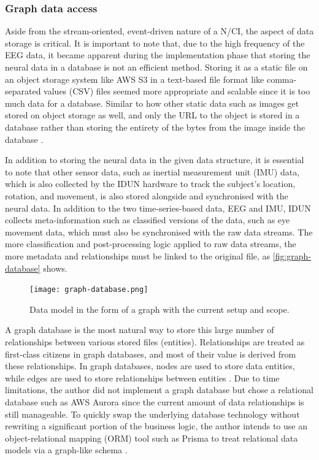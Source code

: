 \subsubsection{Graph data access}
\label{chapter5-graph-data-access}

Aside from the stream-oriented, event-driven nature of a N/CI, the aspect of data storage is critical. It is important to note that, due to the high frequency of the EEG data, it became apparent during the implementation phase that storing the neural data in a database is not an efficient method. Storing it as a static file on an object storage system like AWS S3 in a text-based file format like comma-separated values (CSV) files seemed more appropriate and scalable since it is too much data for a database. Similar to how other static data such as images get stored on object storage as well, and only the URL to the object is stored in a database rather than storing the entirety of the bytes from the image inside the database \citep{datanamic_store_nodate}.

In addition to storing the neural data in the given data structure, it is essential to note that other sensor data, such as inertial measurement unit (IMU) data, which is also collected by the IDUN hardware to track the subject's location, rotation, and movement, is also stored alongside and synchronised with the neural data. In addition to the two time-series-based data, EEG and IMU, IDUN collects meta-information such as classified versions of the data, such as eye movement data, which must also be synchronised with the raw data streams. The more classification and post-processing logic applied to raw data streams, the more metadata and relationships must be linked to the original file, as \autoref{fig:graph-database} shows.

\begin{figure}[!ht]
  \centering
  \texttt{[image: graph-database.png]}
  \caption{Data model in the form of a graph with the current setup and scope.}
  \label{fig:graph-database}
\end{figure}

A graph database is the most natural way to store this large number of relationships between various stored files (entities). Relationships are treated as first-class citizens in graph databases, and most of their value is derived from these relationships. In graph databases, nodes are used to store data entities, while edges are used to store relationships between entities \citep{amazon_web_services_inc_what_nodate}. Due to time limitations, the author did not implement a graph database but chose a relational database such as AWS Aurora since the current amount of data relationships is still manageable. To quickly swap the underlying database technology without rewriting a significant portion of the business logic, the author intends to use an object-relational mapping (ORM) tool such as Prisma to treat relational data models via a graph-like schema \citep{prisma_data_nodate}.

